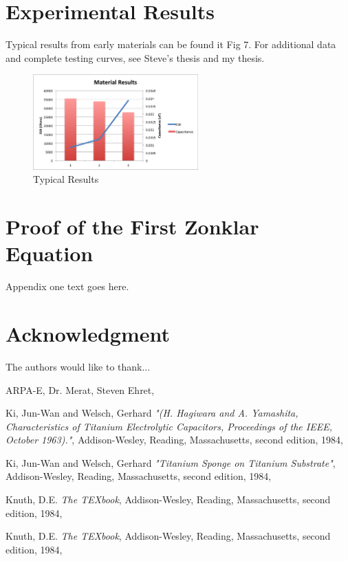 \documentclass[journal]{IEEEtran}
\begin{document}
\section{Experimental Results}
Typical results from early materials can be found it Fig 7. For additional data and complete testing curves, see Steve’s thesis and my thesis.

\begin{figure}[here]
\centering
\includegraphics[width=2.5in]{materialResults}
\caption{Typical Results}
\label{fig:materialResults}
\end{figure}

\appendices
\section{Proof of the First Zonklar Equation}
Appendix one text goes here.

\section*{Acknowledgment}

The authors would like to thank...

ARPA-E,
Dr. Merat,
Steven Ehret,

\ifCLASSOPTIONcaptionsoff
  \newpage
\fi



\begin{thebibliography}{1}

 Ki, Jun-Wan and Welsch, Gerhard \emph{"(H. Hagiwara and A. Yamashita, Characteristics of Titanium Electrolytic Capacitors, Proceedings of the IEEE, October 1963)."}, Addison-Wesley, Reading,
Massachusetts, second edition, 1984,

 Ki, Jun-Wan and Welsch, Gerhard \emph{"Titanium Sponge on Titanium Substrate"}, Addison-Wesley, Reading,
Massachusetts, second edition, 1984,

 Knuth, D.E. \emph{The TEXbook}, Addison-Wesley, Reading,
Massachusetts, second edition, 1984,

 Knuth, D.E. \emph{The TEXbook}, Addison-Wesley, Reading,
Massachusetts, second edition, 1984,

\end{thebibliography}
\end{document}
